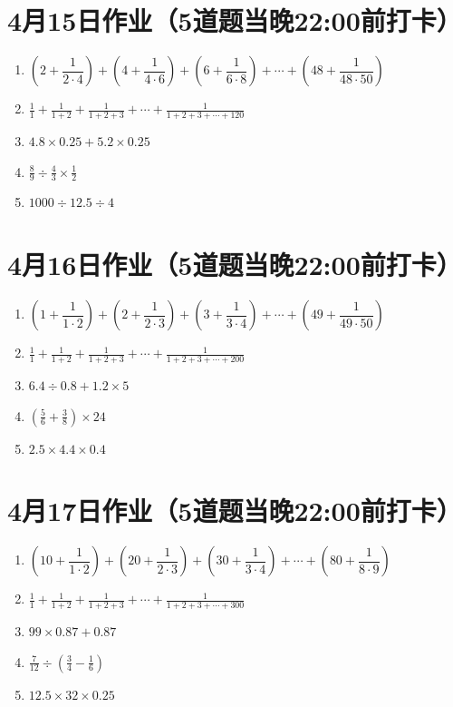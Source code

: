 \documentclass[UTF8,12pt,a4paper]{ctexart}
\newcommand{\BottomWriteSpace}{1.8cm}
\newenvironment{OnePageFiveFill}{
  \small
  \vspace*{0pt}
  \begin{enumerate}[leftmargin=*, itemsep=0pt, topsep=0pt, parsep=0pt, partopsep=0pt]
  \setlength{\parskip}{0pt}
}{
  \end{enumerate}
  \vspace*{\BottomWriteSpace}
  \normalsize
  \newpage
}
\newcommand{\Q}[1]{\item #1\par\vfill}
\newcommand{\Qlast}[1]{\item #1\par}
\begin{document}
\section*{4月15日作业（5道题当晚22:00前打卡）}
\begin{OnePageFiveFill}

\Q{$\left(2+\dfrac{1}{2\cdot4}\right) + \left(4+\dfrac{1}{4\cdot6}\right) + \left(6+\dfrac{1}{6\cdot8}\right) + \cdots + \left(48+\dfrac{1}{48\cdot50}\right)$}

\Q{$\displaystyle \frac{1}{1}+\frac{1}{1+2}+\frac{1}{1+2+3}+\cdots+\frac{1}{1+2+3+\cdots+120}$}

\Q{$4.8 \times 0.25 + 5.2 \times 0.25$}

\Q{$\displaystyle \frac{8}{9} \div \frac{4}{3} \times \frac{1}{2}$}

\Qlast{$1000 \div 12.5 \div 4$}

\end{OnePageFiveFill}

\section*{4月16日作业（5道题当晚22:00前打卡）}
\begin{OnePageFiveFill}

\Q{$\left(1+\dfrac{1}{1\cdot2}\right) + \left(2+\dfrac{1}{2\cdot3}\right) + \left(3+\dfrac{1}{3\cdot4}\right) + \cdots + \left(49+\dfrac{1}{49\cdot50}\right)$}

\Q{$\displaystyle \frac{1}{1}+\frac{1}{1+2}+\frac{1}{1+2+3}+\cdots+\frac{1}{1+2+3+\cdots+200}$}

\Q{$6.4 \div 0.8 + 1.2 \times 5$}

\Q{$\displaystyle \left(\frac{5}{6} + \frac{3}{8}\right) \times 24$}

\Qlast{$2.5 \times 4.4 \times 0.4$}

\end{OnePageFiveFill}

\section*{4月17日作业（5道题当晚22:00前打卡）}
\begin{OnePageFiveFill}

\Q{$\left(10+\dfrac{1}{1\cdot2}\right) + \left(20+\dfrac{1}{2\cdot3}\right) + \left(30+\dfrac{1}{3\cdot4}\right) + \cdots + \left(80+\dfrac{1}{8\cdot9}\right)$}

\Q{$\displaystyle \frac{1}{1}+\frac{1}{1+2}+\frac{1}{1+2+3}+\cdots+\frac{1}{1+2+3+\cdots+300}$}

\Q{$99 \times 0.87 + 0.87$}

\Q{$\displaystyle \frac{7}{12} \div \left(\frac{3}{4} - \frac{1}{6}\right)$}

\Qlast{$12.5 \times 32 \times 0.25$}

\end{OnePageFiveFill}
\end{document}
